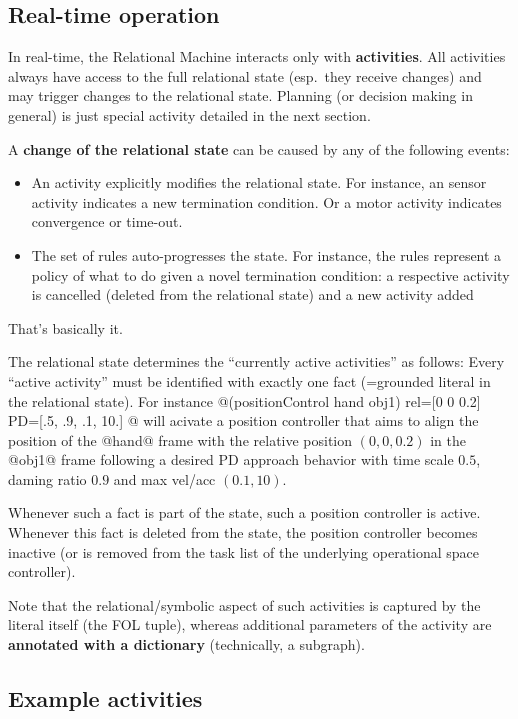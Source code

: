\documentclass[10pt,fleqn,twoside]{article}
\begin{document}
\subsection{Real-time operation}

In real-time, the Relational Machine interacts only with
\textbf{activities}. All activities always have access to the full
relational state (esp.\ they receive changes) and may trigger changes
to the relational state. Planning (or decision making in general) is
just special activity detailed in the next section.

A \textbf{change of the relational state} can be caused by any of the
following events:
\begin{itemize}
\item An activity explicitly modifies the relational state. For instance, an
  sensor activity indicates a new termination condition. Or a motor
  activity indicates convergence or time-out.
\item The set of rules auto-progresses the state. For instance, the
  rules represent a policy of what to do given a novel termination
  condition: a respective activity is cancelled (deleted from the
  relational state) and a new activity added
\end{itemize}
That's basically it.

The relational state determines the ``currently active activities'' as
follows: Every ``active activity'' must be identified with exactly one
fact (=grounded literal in the relational state). For instance
@(positionControl hand obj1){ rel=[0 0 0.2] PD=[.5, .9, .1, 10.] }@
will acivate a position controller that aims to align the position of
the @hand@ frame with the relative position $(0,0,0.2)$ in the @obj1@
frame following a desired PD approach behavior with time scale $0.5$,
daming ratio $0.9$ and max vel/acc $(0.1, 10)$.

Whenever such a fact is part of the state, such a position controller
is active. Whenever this fact is deleted from the state, the position
controller becomes inactive (or is removed from the task list of the
underlying operational space controller).

Note that the relational/symbolic aspect of such activities is captured
by the literal itself (the FOL tuple), whereas additional parameters
of the activity are \textbf{annotated with a dictionary} (technically,
a subgraph).

\subsection{Example activities}
\end{document}
